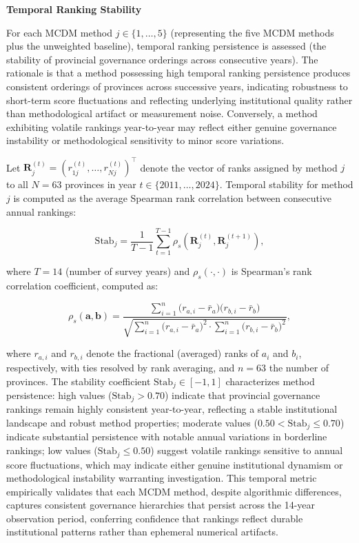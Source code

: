 \documentclass[12pt,a4paper]{article}
\begin{document}
\textbf{Temporal Ranking Stability}

For each MCDM method $j \in \{1, \ldots, 5\}$ (representing the five MCDM methods plus the unweighted baseline), temporal ranking persistence is assessed (the stability of provincial governance orderings across consecutive years). The rationale is that a method possessing high temporal ranking persistence produces consistent orderings of provinces across successive years, indicating robustness to short-term score fluctuations and reflecting underlying institutional quality rather than methodological artifact or measurement noise. Conversely, a method exhibiting volatile rankings year-to-year may reflect either genuine governance instability or methodological sensitivity to minor score variations.

Let $\mathbf{R}_j^{(t)} = (r_{1j}^{(t)}, \ldots, r_{Nj}^{(t)})^\top$ denote the vector of ranks assigned by method $j$ to all $N = 63$ provinces in year $t \in \{2011, \ldots, 2024\}$. Temporal stability for method $j$ is computed as the average Spearman rank correlation between consecutive annual rankings:

\begin{equation}
\label{eq:method_stability}
\mathrm{Stab}_j = \frac{1}{T-1} \sum_{t=1}^{T-1} \rho_s\left( \mathbf{R}_j^{(t)}, \mathbf{R}_j^{(t+1)} \right),
\end{equation}

where $T = 14$ (number of survey years) and $\rho_s(\cdot, \cdot)$ is Spearman's rank correlation coefficient, computed as:

\begin{equation}
\label{eq:spearman_formula}
\rho_s(\mathbf{a}, \mathbf{b}) =
  \frac{\displaystyle\sum_{i=1}^{n}
        \bigl(r_{a,i} - \bar{r}_a\bigr)\bigl(r_{b,i} - \bar{r}_b\bigr)}
       {\sqrt{\displaystyle\sum_{i=1}^{n}\bigl(r_{a,i}-\bar{r}_a\bigr)^2
              \cdot\displaystyle\sum_{i=1}^{n}\bigl(r_{b,i}-\bar{r}_b\bigr)^2}},
\end{equation}

where $r_{a,i}$ and $r_{b,i}$ denote the fractional (averaged) ranks of $a_i$ and $b_i$, respectively, with ties resolved by rank averaging, and $n = 63$ the number of provinces. The stability coefficient $\mathrm{Stab}_j \in [-1, 1]$ characterizes method persistence: high values ($\mathrm{Stab}_j > 0.70$) indicate that provincial governance rankings remain highly consistent year-to-year, reflecting a stable institutional landscape and robust method properties; moderate values ($0.50 < \mathrm{Stab}_j \leq 0.70$) indicate substantial persistence with notable annual variations in borderline rankings; low values ($\mathrm{Stab}_j \leq 0.50$) suggest volatile rankings sensitive to annual score fluctuations, which may indicate either genuine institutional dynamism or methodological instability warranting investigation. This temporal metric empirically validates that each MCDM method, despite algorithmic differences, captures consistent governance hierarchies that persist across the 14-year observation period, conferring confidence that rankings reflect durable institutional patterns rather than ephemeral numerical artifacts.
\end{document}
